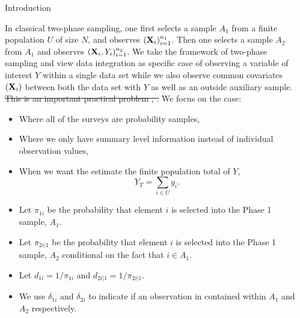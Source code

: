 \documentclass[final]{beamer}
\newlength{\sepwidth}
\newlength{\colwidth}
\newcommand{\separatorcolumn}{\begin{column}{\sepwidth}\end{column}}
\begin{document}
\begin{frame}[t]
\begin{columns}[t]
\separatorcolumn

\begin{column}{\colwidth}

  \begin{block}{Introduction}

    In classical two-phase sampling, one first selects a sample $A_1$ from a
    finite population $U$ of size $N$, and observes $({\bf X}_i)_{i = 1}^{n_1}$.
    Then one selects a sample $A_2$ from $A_1$ and observes 
    $({\bf X}_i, Y_i)_{i = 1}^{n_2}$. We take the
    framework of two-phase sampling and view data integration as specific case
    of observing a variable of interest $Y$ within a single data set while we
    also observe common covariates $({\bf X}_i)$ between both the data set with
    $Y$ as well as an outside auxiliary sample. \sout{This is an important practical
    problem \cite{yang2020statistical}, 
    \cite{dagdoug2023model}.} We focus on the case:

    \begin{itemize}
      \item Where all of the surveys are probability samples, 
      \item Where we only have summary level information instead of individual
        observation values,
      \item When we want the estimate the finite population total of $Y$,
        $$Y_T = \sum_{i \in U} y_i.$$
    \end{itemize}


    \begin{itemize}
      \item Let $\pi_{1i}$ be the probability that element $i$ is selected into
        the Phase 1 sample, $A_1$.
      \item Let $\pi_{2i|1}$ be the probability that element $i$ is selected into
        the Phase 1 sample, $A_2$ conditional on the fact that $i \in A_1$.
      \item Let $d_{1i} = 1 / \pi_{1i}$ and $d_{2i|1} = 1 / \pi_{2i|1}$.
      \item We use $\delta_{1i}$ and $\delta_{2i}$ to indicate if an observation
        in contained within $A_1$ and $A_2$ respectively.
    \end{itemize}

  \end{block}


\end{column}
\end{columns}
\end{frame}
\end{document}
